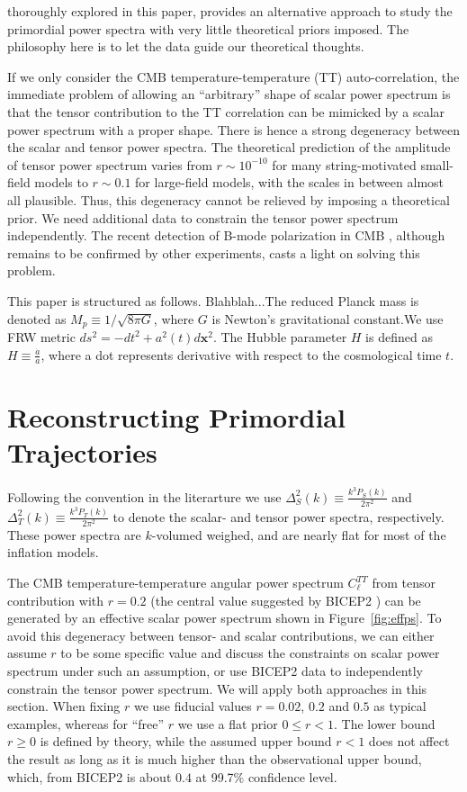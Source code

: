 \documentclass[11pt]{article}
\begin{document}
thoroughly explored in this paper, provides an alternative approach to study the primordial power spectra with very little theoretical priors imposed. The philosophy here is to let the data guide our theoretical thoughts.

If we only consider the CMB temperature-temperature (TT) auto-correlation, the immediate problem of allowing an ``arbitrary'' shape of scalar power spectrum is that the tensor contribution to the TT correlation can be mimicked by a scalar power spectrum with a proper shape. There is hence a strong degeneracy between the scalar and tensor power spectra. The theoretical prediction of the amplitude of tensor power spectrum varies from $r\sim 10^{-10}$ for many string-motivated small-field models to  $r\sim 0.1$ for large-field models, with the scales in between almost all plausible. Thus, this degeneracy cannot be relieved by imposing a theoretical prior. We need additional data to constrain the tensor power spectrum independently. The recent detection of B-mode polarization in CMB \cite{BICEP2}, although remains to be confirmed by other experiments, casts a light on solving this problem. 

This paper is structured as follows. Blahblah...The reduced Planck mass is denoted as $M_p\equiv 1/\sqrt{8\pi G}$, where $G$ is Newton's gravitational constant.We use FRW metric $ds^2 = -dt^2 + a^2(t) d\mathbf{x}^2$. The Hubble parameter $H$ is defined as $H\equiv \frac{\dot a}{a}$, where a dot represents derivative with respect to the cosmological time $t$.

\section{Reconstructing Primordial Trajectories}

Following the convention in the literarture we use $\Delta^2_{S}(k) \equiv \frac{k^3P_S(k)}{2\pi^2}$ and $\Delta^2_T(k) \equiv \frac{k^3P_T(k)}{2\pi^2}$ to denote the scalar- and tensor power spectra, respectively. These power spectra are $k$-volumed weighed, and are nearly flat for most of the inflation models.

The CMB temperature-temperature angular power spectrum $C_\ell^{TT}$ from tensor contribution with $r=0.2$ (the central value suggested by BICEP2 \cite{BICEP2}) can be generated by an effective scalar power spectrum shown in Figure~\ref{fig:effps}. To avoid this degeneracy between tensor- and scalar contributions, we can either assume $r$ to be some specific value and discuss the constraints on scalar power spectrum under such an assumption, or use BICEP2 data to independently constrain the tensor power spectrum. We will apply both approaches in this section. When fixing $r$ we use fiducial values $r=0.02$,  $0.2$ and $0.5$ as typical examples, whereas for ``free'' $r$ we use a flat prior $0\le r < 1$. The lower bound $r\ge 0$ is defined by theory, while the assumed upper bound $r<1$ does not affect the result as long as it is much higher than the observational upper bound, which, from BICEP2 is about $0.4$ at 99.7\% confidence level.   
\end{document}
